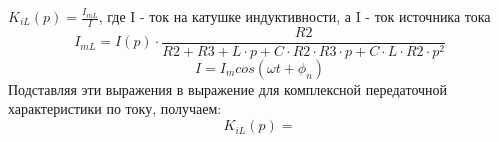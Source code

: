 \documentclass[a4paper,12pt]{article}
\begin{document}
$K_{iL}(p) = \frac{I_{mL}}{I}$, где I - ток на катушке индуктивности, а I - ток источника тока 
$$I_{mL} = I(p)\cdot \frac{R2}{R2+R3+L\cdot p+C\cdot R2\cdot R3\cdot p+C\cdot L\cdot R2\cdot p^2}$$
$$I = I_{m}cos(\omega t + \phi_{n})$$
Подставляя эти выражения в выражение для комплексной передаточной характеристики по току, получаем:
$$K_{iL}(p) = $$
\end{document}
